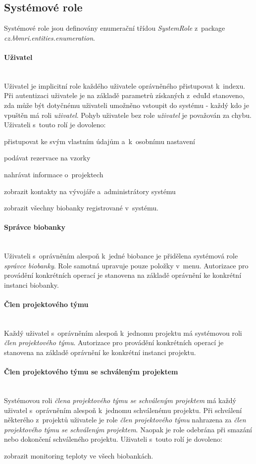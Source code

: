 \documentclass[11pt, draft, oneside]{fithesis2}
\newcommand{\paragraphNewLine}[1]{\paragraph*{#1}\mbox{}\\}
\begin{document}
\subsection{Systémové role}
Systémové role jsou definovány enumerační třídou \textit{SystemRole} z~package \textit{cz.bbmri.entities.enumeration}. 

\paragraphNewLine{Uživatel}
Uživatel je implicitní role každého uživatele oprávněného přistupovat k~indexu. Při autentizaci uživatele je na základě parametrů získaných z~eduId stanoveno, zda může být dotyčnému uživateli umožněno vstoupit do systému - každý kdo je vpuštěn má roli \textit{uživatel}. Pohyb uživatele bez role \textit{uživatel} je považován za chybu.
Uživateli s~touto rolí je dovoleno:
\begin{compactitem}
	\item přistupovat ke svým vlastním údajům a~k~osobnímu nastavení
	\item podávat rezervace na vzorky
	\item nahrávat informace o~projektech
	\item zobrazit kontakty na vývojáře a~administrátory systému
	\item zobrazit všechny biobanky registrované v~systému.
\end{compactitem}

\paragraphNewLine{Správce biobanky}
Uživateli s~oprávněním alespoň k~jedné biobance je přidělena systémová role \textit{správce biobanky}. Role samotná upravuje pouze položky v~menu. Autorizace pro provádění konkrétních operací je stanovena na základě oprávnění ke konkrétní instanci biobanky. 

\paragraphNewLine{Člen projektového týmu} 
Každý uživatel s~oprávněním alespoň k~jednomu projektu má systémovou roli \textit{člen projektového týmu}. Autorizace pro provádění konkrétních operací je stanovena na základě oprávnění ke konkrétní instanci projektu. 

\paragraphNewLine{Člen projektového týmu se schváleným projektem}
Systémovou roli \textit{člena projektového týmu se schváleným projektem} má každý uživatel s~oprávněním alespoň k~jednomu schválenému projektu. Při schválení některého z~projektů uživatele je role \textit{člen projektového týmu} nahrazena za \textit{člen projektového týmu se schváleným projektem}. Naopak je role odebrána při smazání nebo dokončení schváleného projektu.
Uživateli s~touto rolí je dovoleno:
\begin{compactitem}
	\item zobrazit monitoring teploty ve všech biobankách.
\end{compactitem}
\end{document}
